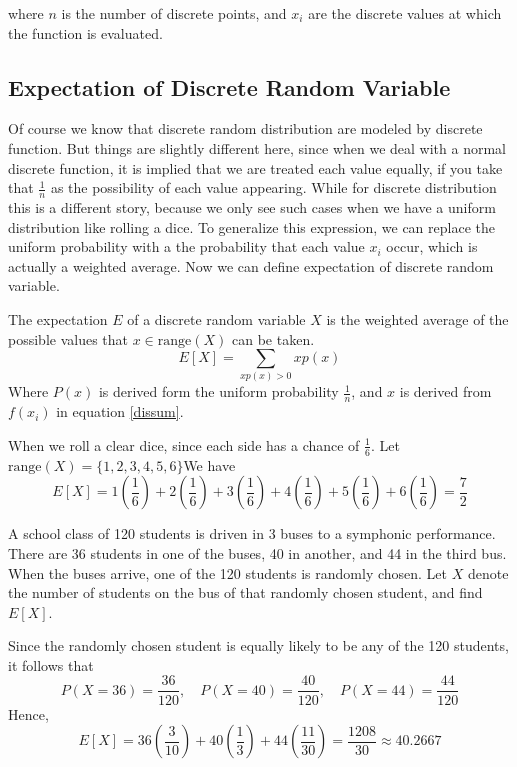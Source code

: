 where $n$ is the number of discrete points, and $x_i$ are the discrete values at which the function is evaluated.

\subsection{Expectation of Discrete Random Variable}
Of course we know that discrete random distribution are modeled by discrete function. But things are slightly different here, since when we deal with a normal discrete function, it is implied that we are treated each value equally, if you take that $\frac{1}{n}$ as the possibility of each value appearing. While for discrete distribution this is a different story, because we only see such cases when we have a uniform distribution like rolling a dice. To generalize this expression, we can replace the uniform probability with a the probability that each value $x_i$ occur, which is actually a weighted average. Now we can define expectation of discrete random variable.
\begin{definition}
The expectation $E$ of a discrete random variable $X$ is the weighted average of the possible values that $x\in \text{range}(X)$ can be taken.
\begin{equation}
E[X] = \sum_{xp(x) > 0} xp(x)
\end{equation}
Where $P(x)$ is derived form the uniform probability $\frac{1}{n}$, and $x$ is derived from $f(x_i)$ in equation \ref*{dissum}.
\end{definition}

\begin{example}
    When we roll a clear dice, since each side has a chance of $\frac{1}{6}$.
    Let $\text{range}(X) = \{1,2,3,4,5,6\}$We have 
    \[
    E[X] = 1\left(\frac16\right)+2\left(\frac16\right)+3\left(\frac16\right)+4\left(\frac16\right)+5\left(\frac16\right)+6\left(\frac16\right)=\frac72
    \]
\end{example}

\begin{example}
    A school class of 120 students is driven in 3 buses to a symphonic performance. There are 36 students in one of the buses, 40 in another, and 44 in the third bus. When the buses arrive, one of the 120 students is randomly chosen. Let $X$ denote the number of students on the bus of that randomly chosen student, and find $E[X]$.
    \begin{solution}
        Since the randomly chosen student is equally likely to be any of the 120 students, it follows that
\[
P(X = 36) = \frac{36}{120}, \quad P(X = 40) = \frac{40}{120}, \quad P(X = 44) = \frac{44}{120}
\]
Hence,
\[
E[X] = 36 \left(\frac{3}{10}\right) + 40 \left(\frac{1}{3}\right) + 44 \left(\frac{11}{30}\right) = \frac{1208}{30} \approx 40.2667
\]
    \end{solution}
\end{example}


